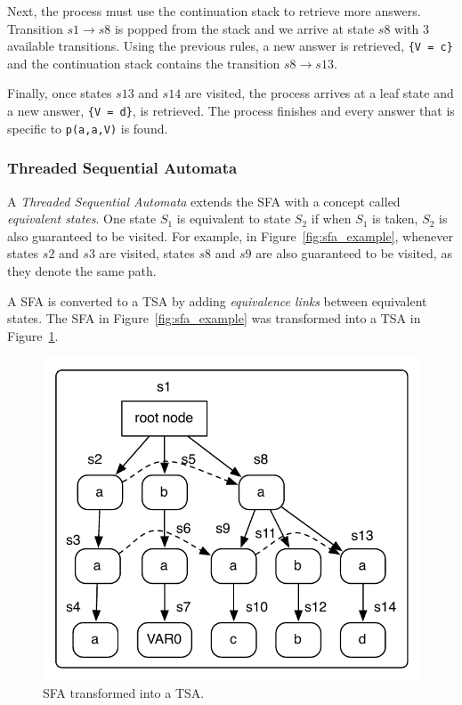 Next, the process must use the continuation stack to retrieve more answers. Transition $s1 \rightarrow s8$ is popped from the stack
and we arrive at state $s8$ with 3 available transitions. Using the previous rules, a new answer is retrieved,
\texttt{\{V~=~c\}} and the continuation stack contains the transition $s8 \rightarrow s13$.

Finally, once states $s13$ and $s14$ are visited, the process arrives at a leaf state and a new answer,
\texttt{\{V~=~d\}}, is retrieved. The process finishes and every answer that is specific to \texttt{p(a,a,V)} is found.

\subsubsection{Threaded Sequential Automata}

A \textit{Threaded Sequential Automata} extends the SFA with a concept called
\textit{equivalent states}. One state $S_1$ is equivalent to state $S_2$ if when $S_1$ is taken, $S_2$ is also
guaranteed to be visited. For example, in Figure~\ref{fig:sfa_example}, whenever states $s2$ and $s3$ are
visited, states $s8$ and $s9$ are also guaranteed to be visited, as they denote the same path.

A SFA is converted to a TSA by adding \textit{equivalence links} between equivalent states.
The SFA in Figure~\ref{fig:sfa_example} was transformed into a TSA in Figure~\ref{fig:tsa_example}.

\begin{figure}[ht]
  \centering
    \includegraphics[scale=0.6]{tsa.pdf}
  \caption{SFA transformed into a TSA.}
  \label{fig:tsa_example}
\end{figure}

